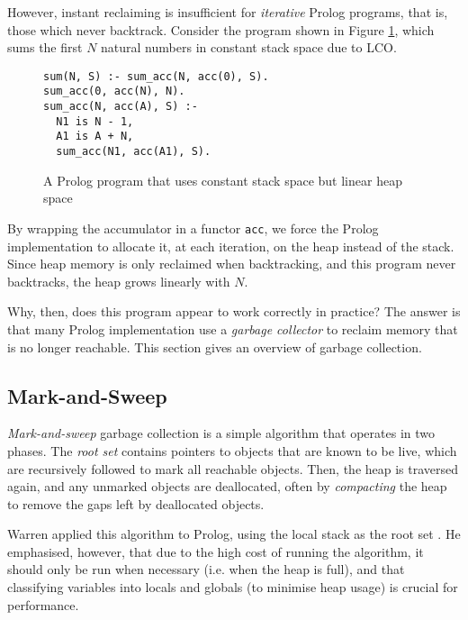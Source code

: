 However, instant reclaiming is insufficient for \emph{iterative} Prolog programs, that is, those which never backtrack. Consider the program shown in Figure \ref{fig:iterative}, which sums the first $N$ natural numbers in constant stack space due to LCO.

\begin{figure}[H]
\begin{center}
\begin{verbatim}
sum(N, S) :- sum_acc(N, acc(0), S).
sum_acc(0, acc(N), N).
sum_acc(N, acc(A), S) :-
  N1 is N - 1,
  A1 is A + N,
  sum_acc(N1, acc(A1), S).
\end{verbatim}
\end{center}
\caption{A Prolog program that uses constant stack space but linear heap space}
\label{fig:iterative}
\end{figure}

By wrapping the accumulator in a functor \texttt{acc}, we force the Prolog implementation to allocate it, at each iteration, on the heap instead of the stack. Since heap memory is only reclaimed when backtracking, and this program never backtracks, the heap grows linearly with $N$.

Why, then, does this program appear to work correctly in practice? The answer is that many Prolog implementation use a \emph{garbage collector} to reclaim memory that is no longer reachable. This section gives an overview of garbage collection.

\subsection{Mark-and-Sweep}

\label{sec:prep-mark-and-sweep}

\emph{Mark-and-sweep} garbage collection is a simple algorithm that operates in two phases. The \emph{root set} contains pointers to objects that are known to be live, which are recursively followed to mark all reachable objects. Then, the heap is traversed again, and any unmarked objects are deallocated, often by \emph{compacting} the heap to remove the gaps left by deallocated objects.

Warren applied this algorithm to Prolog, using the local stack as the root set \cite{warrenImplementingPrologCompiling1977}. He emphasised, however, that due to the high cost of running the algorithm, it should only be run when necessary (i.e. when the heap is full), and that classifying variables into locals and globals (to minimise heap usage) is crucial for performance.

